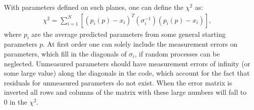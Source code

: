     With parameters defined on such planes, one can define the $\chi^{2}$ as: 
        \begin{align} \label{eq:chi2sum}
            \chi^2 = \sum_{i=1}^{N} [(p_{i}(p)-x_{i})^{T} (\sigma_{i}^{-1}) (p_{i}(p)-x_{i})],
        \end{align}
    where $p_{i}$ are the average predicted parameters from some general starting parameters $p$. At first order one can solely include the measurement errors on parameters, which fill in the diagonals of $\sigma_{i}$, if random processes can be neglected. Unmeasured parameters should have measurement errors of infinity (or some large value) along the diagonals in the code, which account for the fact that residuals for unmeasured parameters do not exist. When the error matrix is inverted all rows and columns of the matrix with these large numbers will fall to 0 in the $\chi^{2}$. 

